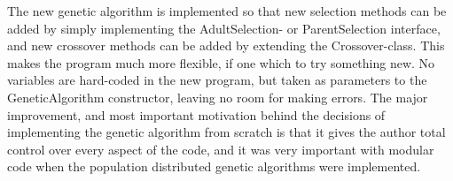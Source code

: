 \noindent The new genetic algorithm is implemented so that new selection methods can be added by simply implementing the AdultSelection- or ParentSelection interface, and new crossover methods can be added by extending the Crossover-class. This makes the program much more flexible, if one which to try something new. No variables are hard-coded in the new program, but taken as parameters to the GeneticAlgorithm constructor, leaving no room for making errors. The major improvement, and most important motivation behind the decisions of implementing the genetic algorithm from scratch is that it gives the author total control over every aspect of the code, and it was very important with modular code when the population distributed genetic algorithms were implemented.